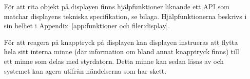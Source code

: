 För att rita objekt på displayen finns hjälpfunktioner liknande ett API som
matchar displayens tekniska specifikation, se bilaga. Hjälpfunktionerna beskrivs
i sin helhet i Appendix~\ref{app:funktioner och filer:display}.

För att reagera på knapptryck på displayen kan displayen instrueras att flytta
hela sitt interna minne (där information om bland annat knapptryck finns) till
ett minne som delas med styrdatorn. Detta minne kan sedan läsas av och systemet
kan agera utifrån händelserna som har skett.

% 
